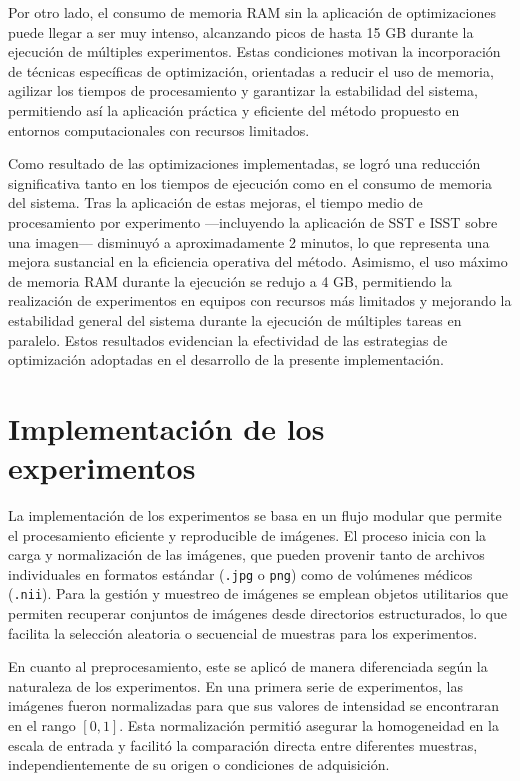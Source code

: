 Por otro lado, el consumo de memoria RAM sin la aplicación de optimizaciones puede llegar a ser muy intenso, alcanzando picos de hasta 15 GB durante la ejecución de múltiples experimentos. Estas condiciones motivan la incorporación de técnicas específicas de optimización, orientadas a reducir el uso de memoria, agilizar los tiempos de procesamiento y garantizar la estabilidad del sistema, permitiendo así la aplicación práctica y eficiente del método propuesto en entornos computacionales con recursos limitados.

Como resultado de las optimizaciones implementadas, se logró una reducción significativa tanto en los tiempos de ejecución como en el consumo de memoria del sistema. Tras la aplicación de estas mejoras, el tiempo medio de procesamiento por experimento —incluyendo la aplicación de SST e ISST sobre una imagen— disminuyó a aproximadamente 2 minutos, lo que representa una mejora sustancial en la eficiencia operativa del método. Asimismo, el uso máximo de memoria RAM durante la ejecución se redujo a 4 GB, permitiendo la realización de experimentos en equipos con recursos más limitados y mejorando la estabilidad general del sistema durante la ejecución de múltiples tareas en paralelo. Estos resultados evidencian la efectividad de las estrategias de optimización adoptadas en el desarrollo de la presente implementación.

\section{Implementación de los experimentos} \label{section:experiment-implementation}

La implementación de los experimentos se basa en un flujo modular que permite el procesamiento eficiente y reproducible de imágenes. El proceso inicia con la carga y normalización de las imágenes, que pueden provenir tanto de archivos individuales en formatos estándar (\texttt{.jpg} o \texttt{png}) como de volúmenes médicos (\texttt{.nii}). Para la gestión y muestreo de imágenes se emplean objetos utilitarios que permiten recuperar conjuntos de imágenes desde directorios estructurados, lo que facilita la selección aleatoria o secuencial de muestras para los experimentos.

En cuanto al preprocesamiento, este se aplicó de manera diferenciada según la naturaleza de los experimentos. En una primera serie de experimentos, las imágenes fueron normalizadas para que sus valores de intensidad se encontraran en el rango $[0, 1]$. Esta normalización permitió asegurar la homogeneidad en la escala de entrada y facilitó la comparación directa entre diferentes muestras, independientemente de su origen o condiciones de adquisición.

